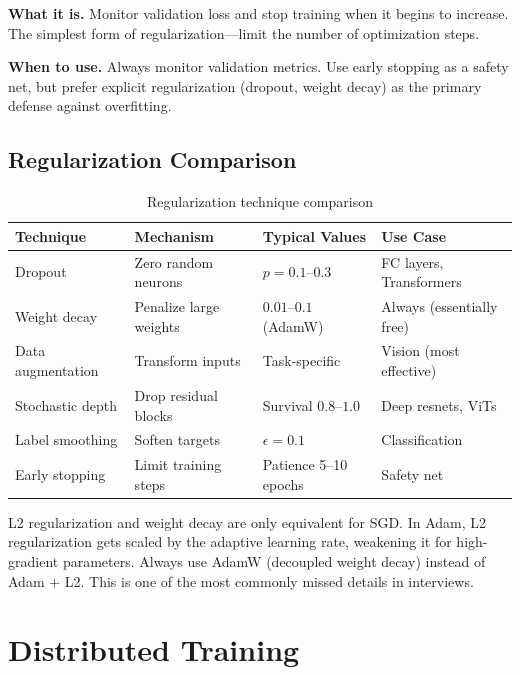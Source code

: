 \textbf{What it is.} Monitor validation loss and stop training when it begins to increase. The simplest form of regularization---limit the number of optimization steps.

\textbf{When to use.} Always monitor validation metrics. Use early stopping as a safety net, but prefer explicit regularization (dropout, weight decay) as the primary defense against overfitting.

\subsection{Regularization Comparison}

\begin{table}[H]
\centering
\caption{Regularization technique comparison}
\begin{tabularx}{\textwidth}{lXlX}
\toprule
\textbf{Technique} & \textbf{Mechanism} & \textbf{Typical Values} & \textbf{Use Case} \\
\midrule
Dropout & Zero random neurons & $p = 0.1$--$0.3$ & FC layers, Transformers \\
Weight decay & Penalize large weights & $0.01$--$0.1$ (AdamW) & Always (essentially free) \\
Data augmentation & Transform inputs & Task-specific & Vision (most effective) \\
Stochastic depth & Drop residual blocks & Survival $0.8$--$1.0$ & Deep resnets, ViTs \\
Label smoothing & Soften targets & $\epsilon = 0.1$ & Classification \\
Early stopping & Limit training steps & Patience 5--10 epochs & Safety net \\
\bottomrule
\end{tabularx}
\end{table}

\begin{warningbox}
L2 regularization and weight decay are only equivalent for SGD. In Adam, L2 regularization gets scaled by the adaptive learning rate, weakening it for high-gradient parameters. Always use AdamW (decoupled weight decay) instead of Adam + L2. This is one of the most commonly missed details in interviews.
\end{warningbox}

\section{Distributed Training}
\label{sec:distributed}

